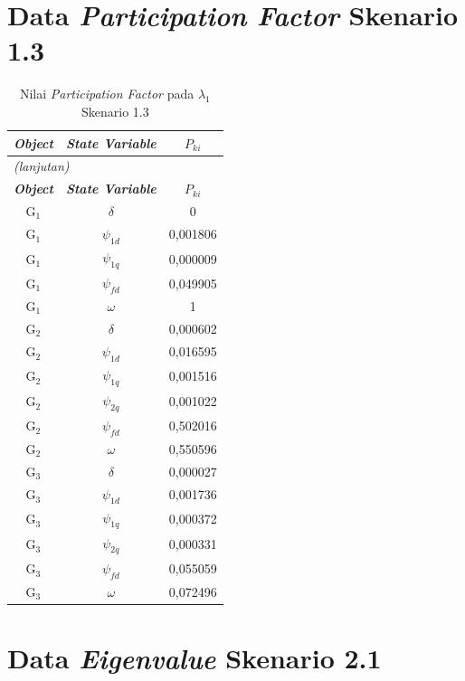 \section{Data \textit{Participation Factor} Skenario 1.3}
\begingroup
\fontsize{12}{14.4}\selectfont
\setlength{\tabcolsep}{8pt}
\begin{longtable}{c c c} \caption[]{Nilai
	\textit{Participation Factor} pada $\lambda_1$ Skenario 1.3}
	\label{tab:prf_sk13_lampiran} \\
	\toprule
	\multicolumn{1}{c}{\textbf{\textit{Object}}} & \textbf{\textit{State
	Variable}} & \textbf{$P_{ki}$} \\
	\midrule
	\endfirsthead
	\multicolumn{3}{l}{\textit{(lanjutan)}} \\
	\toprule
	\multicolumn{1}{c}{\textbf{\textit{Object}}} & \textbf{\textit{State
	Variable}} & \textbf{$P_{ki}$} \\
	\midrule
	\endhead
	\bottomrule
	\endfoot
	G$_1$ & $\delta$   & 0        \\
	G$_1$ & $\psi_{1d}$ & 0,001806 \\
	G$_1$ & $\psi_{1q}$ & 0,000009 \\
	G$_1$ & $\psi_{fd}$ & 0,049905 \\
	G$_1$ & $\omega$ & 1        \\
	G$_2$ & $\delta$   & 0,000602 \\
	G$_2$ & $\psi_{1d}$ & 0,016595 \\
	G$_2$ & $\psi_{1q}$ & 0,001516 \\
	G$_2$ & $\psi_{2q}$ & 0,001022 \\
	G$_2$ & $\psi_{fd}$ & 0,502016 \\
	G$_2$ & $\omega$ & 0,550596 \\
	G$_3$ & $\delta$   & 0,000027 \\
	G$_3$ & $\psi_{1d}$ & 0,001736 \\
	G$_3$ & $\psi_{1q}$ & 0,000372 \\
	G$_3$ & $\psi_{2q}$ & 0,000331 \\
	G$_3$ & $\psi_{fd}$ & 0,055059 \\
	G$_3$ & $\omega$ & 0,072496 \\
\end{longtable}
\par
\endgroup

\section{Data \textit{Eigenvalue} Skenario 2.1}

